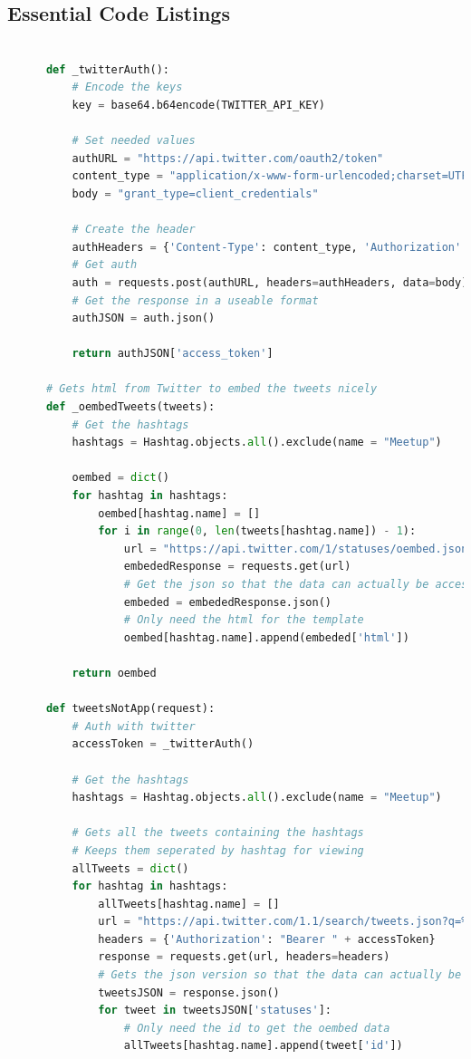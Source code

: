\documentclass[draftclsnofoot,10pt,onecolumn]{IEEEtran} %
\begin{document}
\subsection{Essential Code Listings}
\begin{center}
  \captionsetup{width=.5\linewidth}
  \begin{lstlisting}[caption=Views.py showing the Twitter authorization and
        search for tweets from the application., language=Python]

      def _twitterAuth():
          # Encode the keys
          key = base64.b64encode(TWITTER_API_KEY)

          # Set needed values
          authURL = "https://api.twitter.com/oauth2/token"
          content_type = "application/x-www-form-urlencoded;charset=UTF-8"
          body = "grant_type=client_credentials"

          # Create the header
          authHeaders = {'Content-Type': content_type, 'Authorization': "Basic " + key}
          # Get auth
          auth = requests.post(authURL, headers=authHeaders, data=body)
          # Get the response in a useable format
          authJSON = auth.json()
          
          return authJSON['access_token']

      # Gets html from Twitter to embed the tweets nicely
      def _oembedTweets(tweets):
          # Get the hashtags
          hashtags = Hashtag.objects.all().exclude(name = "Meetup")

          oembed = dict()
          for hashtag in hashtags:
              oembed[hashtag.name] = []
              for i in range(0, len(tweets[hashtag.name]) - 1):
                  url = "https://api.twitter.com/1/statuses/oembed.json?id=" + str(tweets[hashtag.name][i])
                  embededResponse = requests.get(url)
                  # Get the json so that the data can actually be accessed
                  embeded = embededResponse.json()
                  # Only need the html for the template
                  oembed[hashtag.name].append(embeded['html'])

          return oembed

      def tweetsNotApp(request):
          # Auth with twitter
          accessToken = _twitterAuth()

          # Get the hashtags
          hashtags = Hashtag.objects.all().exclude(name = "Meetup")

          # Gets all the tweets containing the hashtags
          # Keeps them seperated by hashtag for viewing
          allTweets = dict()
          for hashtag in hashtags:
              allTweets[hashtag.name] = []
              url = "https://api.twitter.com/1.1/search/tweets.json?q=%23" + hashtag.name + "&src=typd"
              headers = {'Authorization': "Bearer " + accessToken}
              response = requests.get(url, headers=headers)
              # Gets the json version so that the data can actually be accessed
              tweetsJSON = response.json()
              for tweet in tweetsJSON['statuses']:
                  # Only need the id to get the oembed data
                  allTweets[hashtag.name].append(tweet['id'])


\end{lstlisting}
\end{center}
\end{document}
